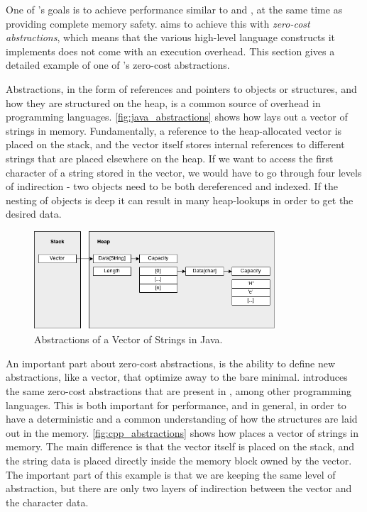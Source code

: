 One of {\rust}'s goals is to achieve performance similar to {\C} and {\Cpp}, at the same time as providing complete memory safety.
{\rust} aims to achieve this with \emph{zero-cost abstractions}, which means that the various high-level language constructs it implements does not come with an execution overhead.
This section gives a detailed example of one of {\rust}'s zero-cost abstractions.

Abstractions, in the form of references and pointers to objects or structures, and how they are
structured on the heap, is a common source of overhead in programming languages.
\autoref{fig:java_abstractions} shows how {\Java} lays out a vector of
strings in memory.
Fundamentally, a reference to the heap-allocated vector is placed on the stack, and the vector itself stores internal references to different strings that are placed elsewhere on the heap.
If we want to access the first character of a string stored in the vector, we would have to go through four levels of indirection - two objects need to be both dereferenced and indexed.
If the nesting of objects is deep it can result in many heap-lookups in order to get the desired data.

\begin{figure}[tb]
  \begin{center}
    \includegraphics[width=0.8\textwidth]{figures/java_abstractions}
  \end{center}
  \caption{Abstractions of a Vector of Strings in Java.}
  \label{fig:java_abstractions}
\end{figure}

An important part about zero-cost abstractions, is the ability to define new abstractions, like a vector, that optimize away to the bare minimal.
{\rust} introduces the same zero-cost abstractions that are present in {\Cpp}, among other programming languages.
This is both important for performance, and in general, in order to have a deterministic and a common understanding of how the structures are laid out in the memory.
\autoref{fig:cpp_abstractions} shows how {\Cpp} places a vector of strings in memory.
The main difference is that the vector itself is placed on the stack, and the string data is placed directly inside the memory block owned by the vector.
The important part of this example is that we are keeping the same level of abstraction, but there are only two layers of indirection between the vector and the character data.

